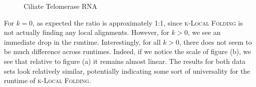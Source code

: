 \documentclass[11pt]{article}
\newcommand{\klf}{\textsc{k-Local Folding}\xspace}
\begin{document}
\begin{figure}[h!]
\caption{Ciliate Telomerase RNA}
\end{figure}

\newpage
For $k=0$, as expected the ratio is approximately 1:1, since \klf is not actually finding any local alignments. However, for $k>0$, we see an immediate drop in the runtime. Interestingly, for all $k>0$, there does not seem to be much difference across runtimes. Indeed, if we notice the scale of figure (b), we see that relative to figure (a) it remains almost linear. The results for both data sets look relatively similar, potentially indicating some sort of universality for the runtime of \klf. 
\end{document}
